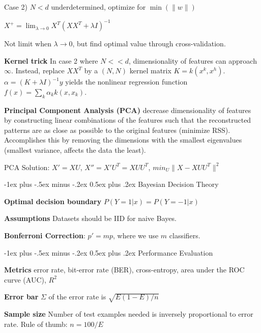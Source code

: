 \documentclass[9pt,landscape]{extarticle}
\makeatletter
\renewcommand{\section}{\@startsection{section}{1}{0mm}%
                                {-1ex plus -.5ex minus -.2ex}%
                                {0.5ex plus .2ex}%
                                {\normalfont\normalsize\bfseries}}
\makeatother
\begin{document}
\begin{multicols}{3}
Case 2) $N < d$ underdetermined, optimize for $\min(\lVert w \rVert)$

$X^+ = \lim_{\lambda \rightarrow 0} X^T(XX^T + \lambda I)^{-1}$

Not limit when $\lambda \rightarrow 0$, but find optimal value through cross-validation.

\textbf{Kernel trick} In case 2 where $N << d$, dimensionality of features can approach $\infty$. Instead, replace $XX^T$ by a $(N, N)$ kernel matrix $K = k(x^k, x^h)$. $\alpha = (K + \lambda I)^{-1} y$ yields the nonlinear regression function $f(x) = \sum_k \alpha_k k(x, x_k)$.

\textbf{Principal Component Analysis (PCA)} decrease dimensionality of features by constructing linear combinations of the features such that the reconstructed patterns are as close as possible to the original features (minimize RSS). Accomplishes this by removing the dimensions with the smallest eigenvalues (smallest variance, affects the data the least).

PCA Solution: $X' = XU$, $X'' = X' U^T = XUU^T$, $min_U \lVert X - XUU^T \rVert^2$


\section{Bayesian Decision Theory}

\textbf{Optimal decision boundary} $P(Y=1 | x) = P(Y=-1 | x)$

\textbf{Assumptions} Datasets should be IID for naive Bayes.

\textbf{Bonferroni Correction}: $p' = mp$, where we use $m$ classifiers.


\section{Performance Evaluation}

\textbf{Metrics} error rate, bit-error rate (BER), cross-entropy, area under the ROC curve (AUC), $R^2$

\textbf{Error bar} $\Sigma$ of the error rate is $\sqrt{E(1-E)/n}$

\textbf{Sample size} Number of test examples needed is inversely proportional to error rate. Rule of thumb: $n = 100/E$


\end{multicols}
\end{document}
